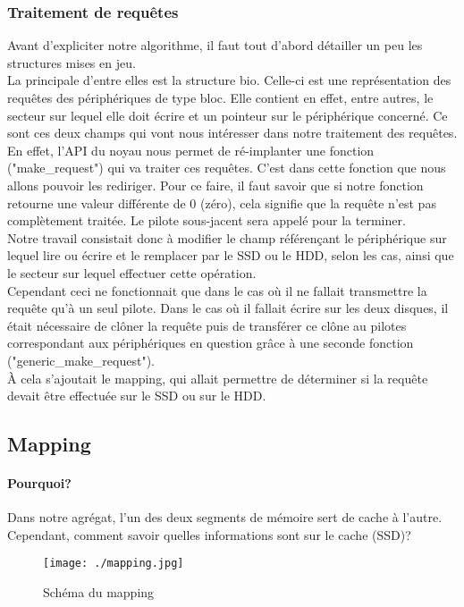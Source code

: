 \documentclass[a4paper,10pt]{article}
\begin{document}
\subsubsection{Traitement de requêtes}
Avant d'expliciter notre algorithme, il faut tout d'abord détailler un peu les structures mises en jeu.\medskip\\
La principale d'entre elles est la structure bio. Celle-ci est une représentation des requêtes des périphériques de type bloc. Elle contient en effet, entre 
autres, le secteur sur lequel elle doit écrire et un pointeur sur le périphérique concerné. Ce sont ces deux champs qui vont nous intéresser dans notre 
traitement des requêtes. En effet, l'API du noyau nous permet de ré-implanter une fonction ("make\_request") qui va traiter ces requêtes. C'est dans cette 
fonction que nous allons pouvoir les rediriger. Pour ce faire, il faut savoir que si notre fonction retourne une valeur différente de 0 (zéro), cela signifie 
que la requête n'est pas complètement traitée. Le pilote sous-jacent sera appelé pour la terminer. \medskip\\
Notre travail consistait donc à modifier le champ référençant le périphérique sur lequel lire ou écrire et le remplacer par le SSD ou le HDD, selon les cas, 
ainsi que le secteur sur lequel effectuer cette opération. \medskip\\
Cependant ceci ne fonctionnait que dans le cas où il ne fallait transmettre la requête qu'à un seul pilote. Dans le cas où il fallait écrire sur les deux 
disques, il était nécessaire de clôner la requête puis de transférer ce clône au pilotes correspondant aux périphériques en question grâce à une seconde 
fonction ("generic\_make\_request"). \medskip\\
À cela s'ajoutait le mapping, qui allait permettre de déterminer si la requête devait être effectuée sur le SSD ou sur le HDD.

\subsection{Mapping}
\paragraph{Pourquoi?}
Dans notre agrégat, l'un des deux segments de mémoire sert de cache à l'autre. Cependant, comment savoir quelles informations sont sur le cache (SSD)? \\
\begin{center}
\begin{figure}[h]
\texttt{[image: ./mapping.jpg]}
\caption{Schéma du mapping}
\end{figure}
\end{center}
\end{document}
